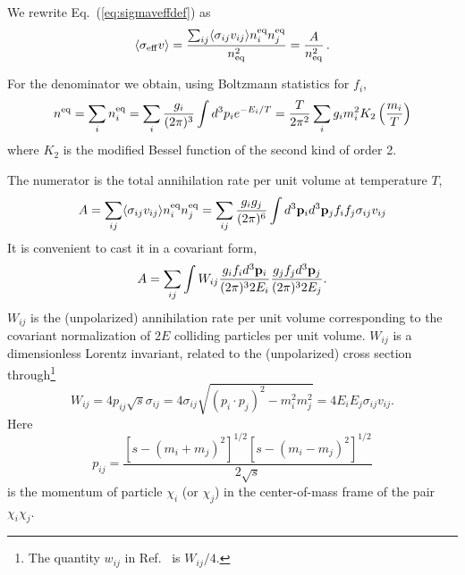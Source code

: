 \documentclass[a4paper,10pt,oneside]{book}
\begin{document}
We rewrite Eq.~(\ref{eq:sigmaveffdef}) as
\begin{equation} \label{eq:sigmaveff}
  \langle \sigma_{\rm{eff}} v \rangle = \frac{ \sum_{ij} \langle
  \sigma_{ij}v_{ij} \rangle n_{i}^{\rm{eq}} n_{j}^{\rm{eq}}}{n^2_{\rm{eq}}}
  = 
  \frac{A}{n_{\rm{eq}}^2} \, .
\end{equation}

For the denominator we obtain, 
using Boltzmann statistics for $f_i$,
\begin{equation} \label{eq:neq}
  n^{\rm eq} = \sum_i n^{\rm eq}_i = 
  \sum_i \frac{g_i}{(2\pi)^3} \int d^3 p_i 
  e^{-E_{i}/T} = 
  \frac{T}{2\pi^2} \sum_i g_i m_{i}^2
  K_{2} \left( \frac{m_{i}}{T}\right)
\end{equation}
where $K_{2}$ is the modified Bessel function of the second kind of 
order 2.

The numerator is the total annihilation rate per unit volume
at temperature $T$,
\begin{equation} 
  A = \sum_{ij} \langle \sigma_{ij} v_{ij} \rangle n_i^{\rm eq}
  n_j^{\rm eq} = \sum_{ij} \frac{g_{i}g_{j}}{(2\pi)^6} \int d^3 {\bf p}_{i}
  d^3{\bf p}_{j} f_{i}f_{j} \sigma_{ij} v_{ij}
\end{equation}
It is convenient
to cast it in a covariant form,
\begin{equation} 
  A = \sum_{ij} 
  \int W_{ij} \frac{g_i f_i d^3{\bf p}_i}{(2\pi)^3 2E_i}
  \frac{g_j f_j d^3{\bf p}_j}{(2\pi)^3 2E_j} .
\label{eq:Aij2}
\end{equation}
$W_{ij}$ is the (unpolarized) annihilation rate per unit volume
corresponding to the covariant normalization of $2E$ colliding
particles per unit volume. $W_{ij}$ is a dimensionless Lorentz
invariant, related to the (unpolarized) cross section
through\footnote{The quantity $w_{ij}$ in Ref.\ \protect\cite{Srednicki:1988ce}
  is $W_{ij}/4$.}
\begin{equation} \label{eq:Wijcross}
  W_{ij} = 4 p_{ij} \sqrt{s} \sigma_{ij} = 4 \sigma_{ij} \sqrt{(p_i
\cdot p_j)^2 - m_i^2 m_j^2} = 4 E_{i} E_{j} \sigma_{ij} v_{ij} .
\end{equation}
Here
\begin{equation}
  p_{ij} =
\frac{\left[s-(m_i+m_j)^2\right]^{1/2}
\left[s-(m_i-m_j)^2\right]^{1/2}}{2\sqrt{s}}
\end{equation}
is the momentum of particle $\chi_i$ (or $\chi_j$) in the
center-of-mass frame of the pair $\chi_i\chi_j$.
\end{document}
